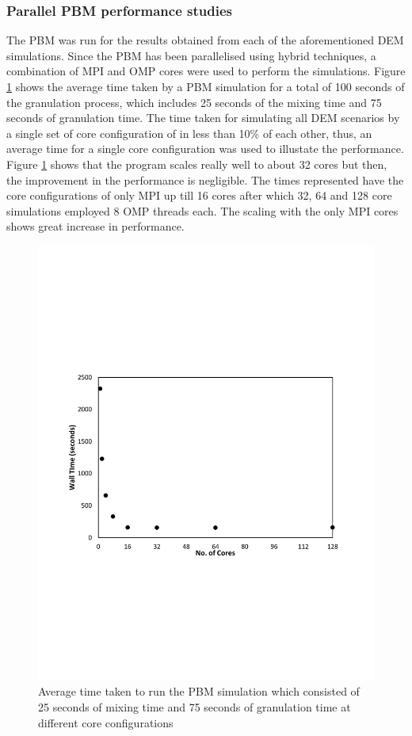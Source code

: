 \documentclass[preprint,11pt,authoryear]{elsarticle}
\begin{document}
\subsubsection{Parallel PBM performance studies}
\par The PBM was run for the results obtained from each of the aforementioned DEM simulations. Since the PBM has been parallelised using hybrid techniques, a combination of MPI and OMP cores were used to perform the simulations. Figure \ref{fig:rslts_PBM_timing_studies} shows the average time taken by a PBM simulation for a total of 100 seconds of the granulation process, which includes 25 seconds of the mixing time and 75 seconds of granulation time. The time taken for simulating all DEM scenarios by a single set of core configuration of in less than 10\% of each other, thus, an  average time for a single core configuration was used to illustate the performance. Figure \ref{fig:rslts_PBM_timing_studies} shows that the program scales really well to about 32 cores but then, the improvement in the performance is negligible. The times represented have the core configurations of only MPI up till 16 cores after which 32, 64 and 128 core simulations employed 8 OMP threads each. The scaling with the only MPI cores shows great increase in performance. \\
\begin{figure}[H]
\centering
\includegraphics[scale=0.7]{rslts_PBM_Time_analysis.pdf}
\caption{Average time taken to run the PBM simulation which consisted of 25 seconds of mixing time and 75 seconds of granulation time at different core configurations}
\label{fig:rslts_PBM_timing_studies}
\end{figure}
\end{document}
